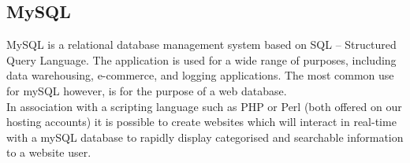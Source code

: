 \subsection{MySQL}
MySQL is a relational database management system based on SQL – Structured Query Language. The application is used for a wide range of purposes, including data warehousing, e-commerce, and logging applications. The most common use for mySQL however, is for the purpose of a web database. \cite{sql}\\
In association with a scripting language such as PHP or Perl (both offered on our hosting accounts) it is possible to create websites which will interact in real-time with a mySQL database to rapidly display categorised and searchable information to a website user.
